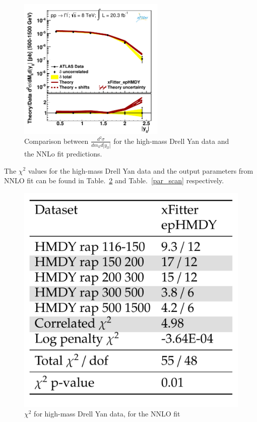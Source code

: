 \begin{figure}
\includegraphics[width=7cm]{data_5.pdf} 
\caption{Comparison between $\frac{d^{2}\sigma}{dm_{ll}d|y_{ll}|}$ for the high-mass Drell Yan data and the NNLo fit predictions.}
\label{hmDY_2D}
\end{figure}
The $\chi^{2}$ values for the high-mass Drell Yan data and the output parameters from NNLO fit can be found in Table.~\ref{chi2_scan} 
and Table.~\ref{par_scan} 
respectively. 
\begin{figure}
\includegraphics[width=14cm]{chi2_hmDY.pdf} 
\caption{$\chi^{2}$ for high-mass Drell Yan data, for the NNLO fit}
\label{chi2_scan}
\end{figure}
